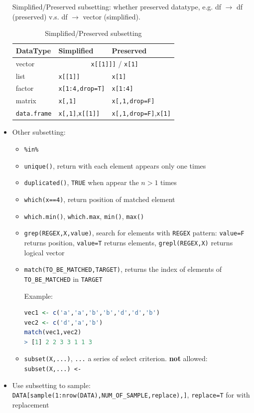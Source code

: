 \begin{itemize}[topsep=2pt,itemsep=0pt]
    Simplified/Preserved subsetting: whether preserved datatype, e.g. df $ \to $ df (preserved) v.s. df $ \to $ vector (simplified).
\begin{table}[H]
    \centering
    \renewcommand\arraystretch{1.15}
    \begin{tabular}{lll}
        \hline
        DataType&Simplified&Preserved\\
        \hline
        vector&\multicolumn{2}{c}{\lstinline|x[[1]]]| / \lstinline|x[1]|}\\
        list&\lstinline|x[[1]]|&\lstinline|x[1]|\\
        factor&\lstinline|x[1:4,drop=T]|&\lstinline|x[1:4]|\\
        matrix&\lstinline|x[,1]|&\lstinline|x[,1,drop=F]|\\
        \lstinline|data.frame|&\lstinline|x[,1]|,\lstinline|x[[1]]|&\lstinline|x[,1,drop=F]|,\lstinline|x[1]|\\
        \hline
    \end{tabular}
    \caption{Simplified/Preserved subsetting}
\end{table}
    \item Other subsetting:
    \begin{itemize}[topsep=2pt,itemsep=0pt]
        \item \lstinline|%in%| 
        \item \lstinline|unique()|, return with each element appears only one times
        \item \lstinline|duplicated()|, \lstinline|TRUE| when appear the $ n>1 $ times
        \item \lstinline|which(x==4)|, return position of matched element
        \item \lstinline|which.min()|, \lstinline|which.max|, \lstinline|min()|, \lstinline|max()|
        \item \lstinline|grep(REGEX,X,value)|, search for elements with \lstinline|REGEX| pattern: \lstinline|value=F| returns position, \lstinline|value=T| returns elements, \lstinline|grepl(REGEX,X)| returns logical vector
        \item \lstinline|match(TO_BE_MATCHED,TARGET)|, returns the index of elements of \lstinline|TO_BE_MATCHED| in \lstinline|TARGET|
        
        \begin{rcode}
            Example:
\begin{lstlisting}[language=R]
vec1 <- c('a','a','b','b','d','d','b')
vec2 <- c('d','a','b')
match(vec1,vec2)
> [1] 2 2 3 3 1 1 3
\end{lstlisting}
        \end{rcode}
        \item \lstinline|subset(X,...)|, \lstinline|...| a series of select criterion. \textbf{not} allowed: \lstinline|subset(X,...) <- | 
    \end{itemize}
    \item Use subsetting to sample: \lstinline|DATA[sample(1:nrow(DATA),NUM_OF_SAMPLE,replace),]|, \lstinline|replace=T| for with replacement
\end{itemize}

